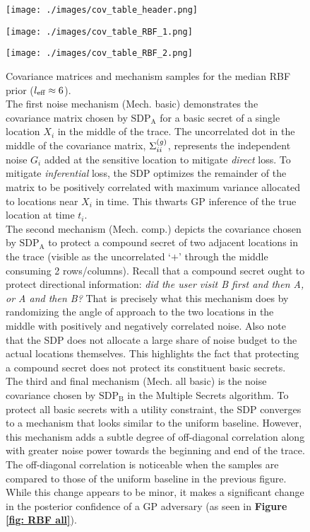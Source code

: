 \begin{figure*}[h] \ContinuedFloat
	\begin{subfigure}[b]{1\textwidth}
		\centering
		\texttt{[image: ./images/cov\_table\_header.png]}
	\end{subfigure}
	\begin{subfigure}[b]{1\textwidth}
		\centering
		\texttt{[image: ./images/cov\_table\_RBF\_1.png]}
	\end{subfigure}
	\begin{subfigure}[b]{1\textwidth}
		\centering
		\texttt{[image: ./images/cov\_table\_RBF\_2.png]}
		\caption[Covariance matrices and mechanism samples for the median RBF prior ($\leff \approx 6$).]{
			Covariance matrices and mechanism samples for the median RBF prior ($\leff \approx 6$). 
			\vspace{2mm} \\
			The first noise mechanism (Mech. basic) demonstrates the covariance matrix chosen by $\text{SDP}_\text{A}$ for a basic secret of a single location $X_i$ in the middle of the trace. The uncorrelated dot in the middle of the covariance matrix, $\Sigma^{(g)}_{ii}$, represents the independent noise $G_i$ added at the sensitive location to mitigate \emph{direct} loss. To mitigate \emph{inferential} loss, the SDP optimizes the remainder of the matrix to be positively correlated with maximum variance allocated to locations near $X_i$ in time. This thwarts GP inference of the true location at time $t_i$. 
			\vspace{2mm} \\
			The second mechanism (Mech. comp.) depicts the covariance chosen by $\text{SDP}_\text{A}$ to protect a compound secret of two adjacent locations in the trace (visible as the uncorrelated `$+$' through the middle consuming 2 rows/columns). Recall that a compound secret ought to protect directional information: \emph{did the user visit B first and then A, or A and then B?} That is precisely what this mechanism does by randomizing the angle of approach to the two locations in the middle with positively and negatively correlated noise. Also note that the SDP does not allocate a large share of noise budget to the actual locations themselves. This highlights the fact that protecting a compound secret does not protect its constituent basic secrets.
			\vspace{2mm} \\
			The third and final mechanism (Mech. all basic) is the noise covariance chosen by $\text{SDP}_\text{B}$ in the Multiple Secrets algorithm. To protect all basic secrets with a utility constraint, the SDP converges to a mechanism that looks similar to the uniform baseline. However, this mechanism adds a subtle degree of off-diagonal correlation along with greater noise power towards the beginning and end of the trace. The off-diagonal correlation is noticeable when the samples are compared to those of the uniform baseline in the previous figure. While this change appears to be minor, it makes a significant change in the posterior confidence of a GP adversary (as seen in \textbf{Figure \ref{fig: RBF all}}). 
}
\end{subfigure}
\end{figure*}
